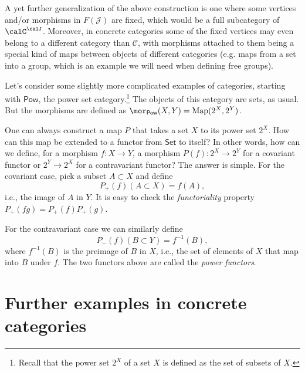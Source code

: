 %
\begin{example}
    A yet further generalization of the above construction is one where
    some vertices and/or morphisms in $F\left(\mathcal{J}\right)$ are
    fixed, which would be a full subcategory of $\calC^\calJ$.
    Moreover, in concrete categories some of the fixed vertices may even
    belong to a different category than $\mathcal{C}$, with morphisms
    attached to them being a special kind of maps between objects of different
    categories (e.g. maps from a set into a group, which is an example
    we will need when defining free groups).
\end{example}
%
\begin{example}
    Let's consider some slightly more complicated examples of categories,
    starting with $\mathsf{Pow}$, the power set category.\footnote{Recall that the power set $2^{X}$ of a set $X$ is defined as the
    set of subsets of $X$.} The objects of this category are sets, as usual. But the morphisms
    are defined as $\mor_{\mathsf{Pow}}(X,Y)=\text{Map}(2^{X},2^{Y})$.

    One can always construct a map $P$ that takes a set $X$ to its power
    set $2^{X}$. How can this map be extended to a functor from $\mathsf{Set}$
    to itself? In other words, how can we define, for a morphism $f:X\rightarrow Y$,
    a morphism $P(f):2^{X}\rightarrow2^{Y}$ for a covariant functor or
    $2^{Y}\rightarrow2^{X}$ for a contravariant functor? The answer is
    simple. For the covariant case, pick a subset $A\subset X$ and define
    \begin{equation}
    P_{+}(f)(A\subset X)=f(A),
    \end{equation}
    i.e., the image of $A$ in $Y$. It is easy to check the \emph{functoriality}
    property $P_{+}\left(fg\right)=P_{+}\left(f\right)P_{+}\left(g\right)$.

    For the contravariant case we can similarly define
    \begin{equation}
        P_{-}(f)(B\subset Y)=f^{-1}(B),
    \end{equation}
    where $f^{-1}(B)$ is the preimage of $B$ in $X$, i.e., the set
    of elements of $X$ that map into $B$ under $f$. The two functors
    above are called the \emph{power functors}.
\end{example}

\section{Further examples in concrete categories}

